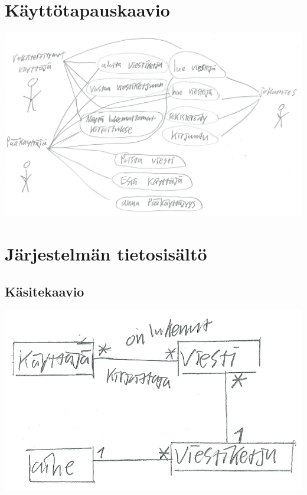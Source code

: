 \documentclass[a4paper, 12pt, finnish]{article}
\begin{document}
\section{Käyttötapauskaavio}
\includegraphics[width=\textwidth,height=\textheight,keepaspectratio]{kayttotapauskaavio.png}

\newpage

\section{Järjestelmän tietosisältö}
\subsection{Käsitekaavio}
\includegraphics[width=\textwidth,height=\textheight,keepaspectratio]{kasitekaavio.png}
\end{document}
